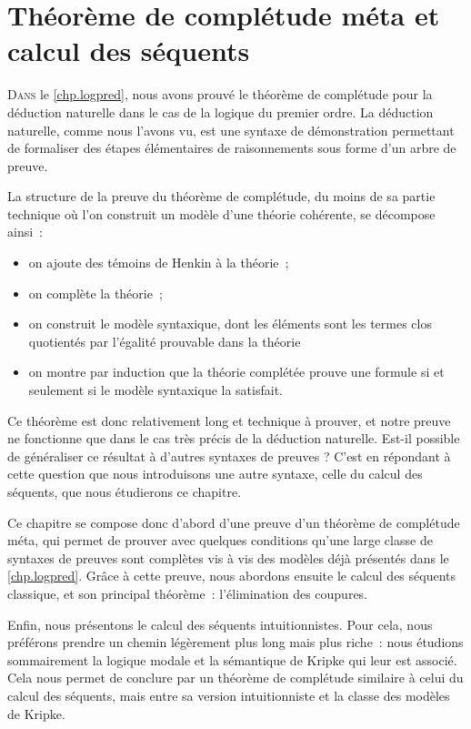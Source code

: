 \chapter[Calcul des séquents]{Théorème de complétude méta et
  calcul des séquents}\label{chp.sequents}

\minitoc

\lettrine{D}{ans} le \cref{chp.logpred}, nous avons prouvé le théorème de
complétude pour la déduction naturelle dans le cas de la logique du premier
ordre. La déduction naturelle, comme nous l'avons vu, est une syntaxe de
démonstration permettant de formaliser des étapes élémentaires de raisonnements
sous forme d'un arbre de preuve.

La structure de la preuve du théorème de complétude, du moins de sa partie
technique où l'on construit un modèle d'une théorie cohérente, se décompose
ainsi~:
\begin{itemize}
\item on ajoute des témoins de Henkin à la théorie~;
\item on complète la théorie~;
\item on construit le modèle syntaxique, dont les éléments sont les termes clos
  quotientés par l'égalité prouvable dans la théorie
\item on montre par induction que la théorie complétée prouve une formule si et
  seulement si le modèle syntaxique la satisfait.
\end{itemize}

Ce théorème est donc relativement long et technique à prouver, et notre preuve
ne fonctionne que dans le cas très précis de la déduction naturelle. Est-il
possible de généraliser ce résultat à d'autres syntaxes de preuves ? C'est en
répondant à cette question que nous introduisons une autre syntaxe, celle du
calcul des séquents, que nous étudierons ce chapitre.

Ce chapitre se compose donc d'abord d'une preuve d'un théorème de complétude
\og méta\fg, qui permet de prouver avec quelques conditions qu'une large classe
de syntaxes de preuves sont complètes vis à vis des modèles déjà présentés dans
le \cref{chp.logpred}. Grâce à cette preuve, nous abordons ensuite le calcul des
séquents classique, et son principal théorème~: l'élimination des coupures.

Enfin, nous présentons le calcul des séquents intuitionnistes. Pour cela, nous
préférons prendre un chemin légèrement plus long mais plus riche~: nous étudions
sommairement la logique modale et la sémantique de Kripke qui leur est associé.
Cela nous permet de conclure par un théorème de complétude similaire à celui du
calcul des séquents, mais entre sa version intuitionniste et la classe des
modèles de Kripke.

